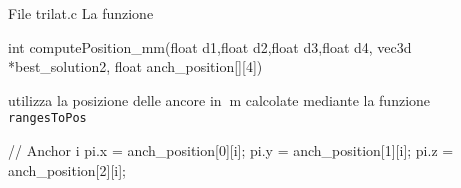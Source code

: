 \begin{frame}[fragile]{File trilat.c}
  La funzione
  \begin{C}
    int computePosition_mm(float d1,float d2,float d3,float d4, vec3d *best_solution2, float anch_position[][4])
  \end{C}
  utilizza la posizione delle ancore in $\SI{}{\meter}$ calcolate mediante la funzione \lstinline[languace=C]!rangesToPos!
  \begin{C}
    // Anchor i
    pi.x = anch_position[0][i];
    pi.y = anch_position[1][i];
    pi.z = anch_position[2][i];
  \end{C}
\end{frame}
  


